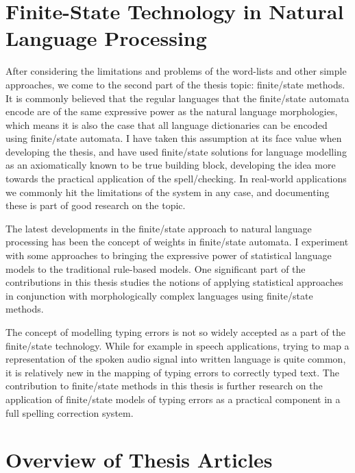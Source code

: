 \documentclass[officiallayout]{unihelcompling}
\begin{document}
\section{Finite-State Technology in Natural Language Processing}
\label{sec:finite-state-technology-in-nlp}

After considering the limitations and problems of the word-lists and other
simple approaches, we come to the second part of the thesis topic: finite\-/state
methods.  It is commonly believed that the regular languages that the
finite\-/state automata encode are of the same expressive power as the natural
language morphologies, which means it is also the case that all language
dictionaries can be encoded using finite\-/state automata. I have taken this
assumption at its face value when developing the thesis, and have used
finite\-/state solutions for language modelling as an axiomatically known to be
true building block, developing the idea more towards the practical application
of the spell\-/checking. In real-world applications we commonly hit the
limitations of the system in any case, and documenting these is part of good
research on the topic.

The latest developments in the finite\-/state approach to natural language
processing has been the concept of weights in finite\-/state automata.  I
experiment with some approaches to bringing the expressive power of
statistical language models to the traditional rule-based models. One
significant part of the contributions in this thesis studies the notions of
applying statistical approaches in conjunction with morphologically complex
languages using finite\-/state methods.

The concept of modelling typing errors is not so widely accepted as a part of
the finite\-/state technology. While for example in speech applications,
trying to map a representation of the spoken audio signal into written language
is quite common, it is relatively new in the mapping of typing errors to
correctly typed text. The contribution to finite\-/state methods in this thesis
is further research on the application of finite\-/state models of typing errors
as a practical component in a full spelling correction system.


\section{Overview of Thesis Articles}
\label{sec:articles}
\end{document}
